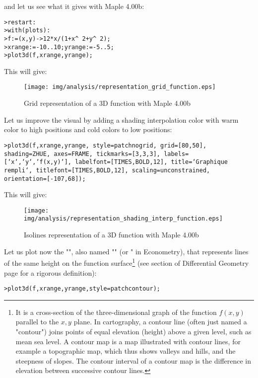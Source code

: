 and let us see what it gives with  Maple 4.00b:

\texttt{>restart:}\\
\texttt{>with(plots):}\\
\texttt{>f:=(x,y)->12*x/(1+x\string^ 2+y\string^ 2);}\\
\texttt{>xrange:=-10..10;yrange:=-5..5;}\\
\texttt{>plot3d(f,xrange,yrange);}

This will give:

\begin{figure}[H]
\centering
\texttt{[image: img/analysis/representation\_grid\_function.eps]}
\caption{Grid representation of a 3D function with Maple 4.00b}
\end{figure}

Let us improve the visual by adding a shading interpolation color with warm color to high positions and cold colors to low positions:

\texttt{>plot3d(f,xrange,yrange, style=patchnogrid, grid=[80,50], shading=ZHUE, axes=FRAME, tickmarks=[3,3,3], labels=[`x`,`y`,`f(x,y)`], labelfont=[TIMES,BOLD,12], title=`Graphique rempli`, titlefont=[TIMES,BOLD,12], scaling=unconstrained, orientation=[-107,68]);}

This will give:

\begin{figure}[H]
\centering
\texttt{[image: img/analysis/representation\_shading\_interp\_function.eps]}
\caption{Isolines representation of a 3D function with Maple 4.00b}
\end{figure}

Let us plot now the "", also named "\label{isoline}" (or " in Econometry), that represents lines of the same height on the function surface\footnote{It is a cross-section of the three-dimensional graph of the function $f(x, y)$ parallel to the $x, y$ plane. In cartography, a contour line (often just named a "contour") joins points of equal elevation (height) above a given level, such as mean sea level. A contour map is a map illustrated with contour lines, for example a topographic map, which thus shows valleys and hills, and the steepness of slopes. The contour interval of a contour map is the difference in elevation between successive contour lines.} (see section of Differential Geometry page \pageref{isoline} for a rigorous definition):

\texttt{>plot3d(f,xrange,yrange,style=patchcontour);}

